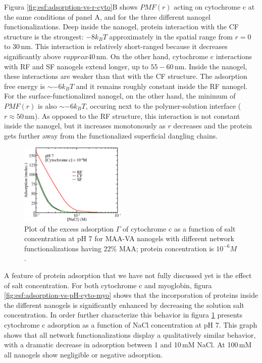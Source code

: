 Figura \ref{fig:esf:adsorption-vs-r-cyto}B shows ${PMF}(r)$ acting on cytochrome c at the same conditions of panel A, and for the three different nanogel functionalizations.
Deep inside the nanogel, protein interaction with the CF structure is the strongest: $-8k_B T$ approximately in the spatial range from $r=0$ to 30\,nm.
This interaction is relatively short-ranged because it decreases significantly above $r approx 40$\,nm.
On the other hand,  cytochrome c interactions with RF and SF nanogels extend longer, up to $55-60$\,nm.
Inside the nanogel, these interactions are weaker than that with the CF structure.
The adsorption free energy is $\sim -6 k_BT$ and it remains roughly constant inside the RF nanogel.
For the surface-functionalized nanogel, on the other hand, the minimum of ${PMF}(r)$ is also $\sim -6 k_BT$, occuring next to the polymer-solution interface ($r\approx 50$\,nm).
As opposed to the RF structure, this interaction is not constant inside the nanogel, but it increases monotonously as $r$ decreases and the protein gets further away from the functionalized superficial dangling chains.













\begin{figure}
     \centering
     \includegraphics[width=0.45\textwidth]{Figures/graphs-gel2/gamma-salts-cyto.png}
     \caption{Plot of the excess adsorption $\Gamma$ of cytochrome c as a function of salt concentration at pH 7 for MAA-VA nanogels with different network functionalizations having 22\% MAA; protein concentration is $10^{-6}M$.}
     \label{fig:esf:adsorption-vs-salt-cyto}
 \end{figure}
 

A feature of protein adsorption that we have not fully discussed yet is the effect of salt concentration.
For both cytochrome c and myoglobin, figura \ref{fig:esf:adsorption-vs-pH-cyto-myo} shows that the incorporation of proteins inside the different nanogels is significantly enhanced by decreasing the solution salt concentration.
In order further characterize this behavior in  figura \ref{fig:esf:adsorption-vs-salt-cyto} presents cytochrome c adsorption as a function of NaCl concentration at pH 7. 
This graph shows that all network functionalizations display a qualitatively similar behavior, with a dramatic decrease in adsorption between 1 and 10\,mM NaCl.
At 100\,mM all nanogels show negligible or negative adsorption.

